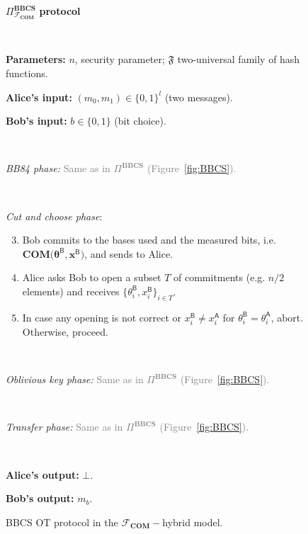 \begin{figure}[h!]
\centering
\begin{tcolorbox}
                        
    \centerline{$\Pi^{\textbf{BBCS}}_{\mathcal{F}_{\textbf{COM}}}$ \textbf{protocol}}
            
    \
    
    \textbf{Parameters:} $n$, security parameter; $\mathfrak{F}$ two-universal family of hash functions.
    
    \textbf{Alice's input:} $(m_0, m_1)\in\{0,1\}^l$ (two messages). 
    
    \textbf{Bob's input:} $b\in\{0,1\}$ (bit choice).
    
    \
    
    \textit{BB84 phase:} \textcolor{gray}{Same as in $\Pi^{\textbf{BBCS}}$ (Figure~\ref{fig:BBCS}).}
    
    
    \
    
    \textit{Cut and choose phase}:
    \begin{enumerate}
    \setcounter{enumi}{2}
        \item Bob commits to the bases used and the measured bits, i.e. $\textbf{COM}\big(\bm{\theta}^\mathsf{B}, \bm{x}^\mathsf{B}\big)$, and sends to Alice. %
        \item Alice asks Bob to open a subset $T$ of commitments (e.g. $n/2$ elements) and receives $\{\theta_i^\mathsf{B}, x_i^\mathsf{B}\}_{i\in T}$.%
        \item In case any opening is not correct or $x_i^\mathsf{B} \neq x_i^\mathsf{A}$ for $\theta_i^\mathsf{B} = \theta_i^\mathsf{A}$, abort. Otherwise, proceed. 
    \end{enumerate}
    
    \
    
    \textit{Oblivious key phase:} \textcolor{gray}{Same as in $\Pi^{\textbf{BBCS}}$ (Figure~\ref{fig:BBCS}).}
     
    \
     
    \textit{Transfer phase:} \textcolor{gray}{Same as in $\Pi^{\textbf{BBCS}}$ (Figure~\ref{fig:BBCS}).}
    
    \
    
\textbf{Alice's output:} $\bot$.

\textbf{Bob's output:} $m_b$.
    
\end{tcolorbox} 
    \caption{BBCS OT protocol in the $\mathcal{F}_{\textbf{COM}}-$hybrid model.}
    \label{fig:BBCS_COM}
\end{figure}

